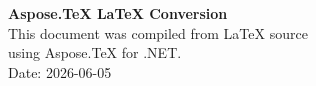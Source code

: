 ﻿\documentclass{minimal}
\begin{document}
\textbf{Aspose.TeX LaTeX Conversion}\\
This document was compiled from LaTeX source\\
using Aspose.TeX for .NET.\\
Date: 2026-06-05
\end{document}
